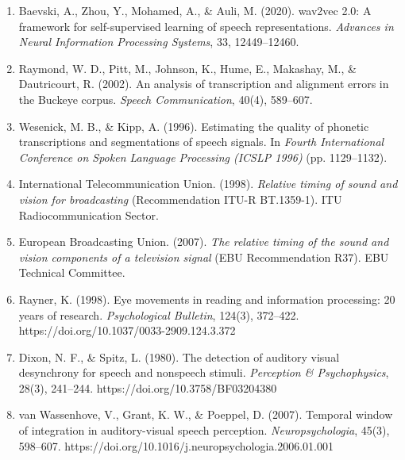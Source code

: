 \documentclass[12pt,a4paper]{article}
\begin{document}
\begin{enumerate}
    \item Baevski, A., Zhou, Y., Mohamed, A., \& Auli, M. (2020). wav2vec 2.0: A framework for self-supervised learning of speech representations. \textit{Advances in Neural Information Processing Systems}, 33, 12449--12460.
    \item Raymond, W. D., Pitt, M., Johnson, K., Hume, E., Makashay, M., \& Dautricourt, R. (2002). An analysis of transcription and alignment errors in the Buckeye corpus. \textit{Speech Communication}, 40(4), 589--607.
    \item Wesenick, M. B., \& Kipp, A. (1996). Estimating the quality of phonetic transcriptions and segmentations of speech signals. In \textit{Fourth International Conference on Spoken Language Processing (ICSLP 1996)} (pp. 1129--1132).
    \item International Telecommunication Union. (1998). \textit{Relative timing of sound and vision for broadcasting} (Recommendation ITU-R BT.1359-1). ITU Radiocommunication Sector.
    \item European Broadcasting Union. (2007). \textit{The relative timing of the sound and vision components of a television signal} (EBU Recommendation R37). EBU Technical Committee.
    \item Rayner, K. (1998). Eye movements in reading and information processing: 20 years of research. \textit{Psychological Bulletin}, 124(3), 372--422. https://doi.org/10.1037/0033-2909.124.3.372
    \item Dixon, N. F., \& Spitz, L. (1980). The detection of auditory visual desynchrony for speech and nonspeech stimuli. \textit{Perception \& Psychophysics}, 28(3), 241--244. https://doi.org/10.3758/BF03204380
    \item van Wassenhove, V., Grant, K. W., \& Poeppel, D. (2007). Temporal window of integration in auditory-visual speech perception. \textit{Neuropsychologia}, 45(3), 598--607. https://doi.org/10.1016/j.neuropsychologia.2006.01.001
\end{enumerate}

\vspace{0.4cm}
\end{document}
